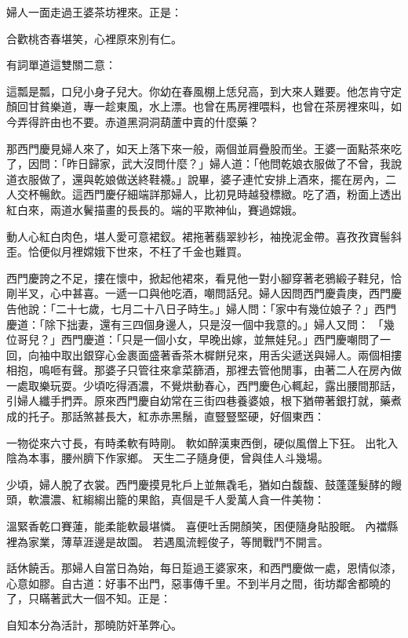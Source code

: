 婦人一面走過王婆茶坊裡來。正是：

合歡桃杏春堪笑，心裡原來別有仁。

有詞單道這雙關二意：

這瓢是瓢，口兒小身子兒大。你幼在春風棚上恁兒高，到大來人難要。他怎肯守定顏回甘貧樂道，專一趁東風，水上漂。也曾在馬房裡喂料，也曾在茶房裡來叫，如今弄得許由也不要。赤道黑洞洞葫蘆中賣的什麼藥？

那西門慶見婦人來了，如天上落下來一般，兩個並肩疊股而坐。王婆一面點茶來吃了，因問：「昨日歸家，武大沒問什麼？」婦人道：「他問乾娘衣服做了不曾，我說道衣服做了，還與乾娘做送終鞋襪。」說畢，婆子連忙安排上酒來，擺在房內，二人交杯暢飲。這西門慶仔細端詳那婦人，比初見時越發標緻。吃了酒，粉面上透出紅白來，兩道水鬢描畫的長長的。端的平欺神仙，賽過嫦娥。

動人心紅白肉色，堪人愛可意裙釵。裙拖著翡翠紗衫，袖挽泥金帶。喜孜孜寶髻斜歪。恰便似月裡嫦娥下世來，不枉了千金也難買。

西門慶誇之不足，摟在懷中，掀起他裙來，看見他一對小腳穿著老鴉緞子鞋兒，恰剛半叉，心中甚喜。一遞一口與他吃酒，嘲問話兒。婦人因問西門慶貴庚，西門慶告他說：「二十七歲，七月二十八日子時生。」婦人問：「家中有幾位娘子？」西門慶道：「除下拙妻，還有三四個身邊人，只是沒一個中我意的。」婦人又問： 「幾位哥兒？」西門慶道：「只是一個小女，早晚出嫁，並無娃兒。」西門慶嘲問了一回，向袖中取出銀穿心金裹面盛著香茶木樨餅兒來，用舌尖遞送與婦人。兩個相摟相抱，鳴咂有聲。那婆子只管往來拿菜篩酒，那裡去管他閒事，由著二人在房內做一處取樂玩耍。少頃吃得酒濃，不覺烘動春心，西門慶色心輒起，露出腰間那話，引婦人纖手捫弄。原來西門慶自幼常在三街四巷養婆娘，根下猶帶著銀打就，藥煮成的托子。那話煞甚長大，紅赤赤黑鬚，直豎豎堅硬，好個東西：

一物從來六寸長，有時柔軟有時剛。
軟如醉漢東西倒，硬似風僧上下狂。
出牝入陰為本事，腰州臍下作家鄉。
天生二子隨身便，曾與佳人斗幾場。

少頃，婦人脫了衣裳。西門慶摸見牝戶上並無毳毛，猶如白馥馥、鼓蓬蓬髮酵的饅頭，軟濃濃、紅縐縐出籠的果餡，真個是千人愛萬人貪一件美物：

溫緊香乾口賽蓮，能柔能軟最堪憐。
喜便吐舌開顏笑，困便隨身貼股眠。
內襠縣裡為家業，薄草涯邊是故園。
若遇風流輕俊子，等閒戰鬥不開言。

話休饒舌。那婦人自當日為始，每日踅過王婆家來，和西門慶做一處，恩情似漆，心意如膠。自古道：好事不出門，惡事傳千里。不到半月之間，街坊鄰舍都曉的了，只瞞著武大一個不知。正是：

自知本分為活計，那曉防奸革弊心。

